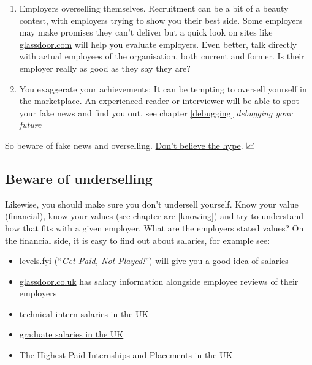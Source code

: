 \documentclass[
]{book}
\providecommand{\tightlist}{%
  \setlength{\itemsep}{0pt}\setlength{\parskip}{0pt}}
\begin{document}
\begin{enumerate}
\def\labelenumi{\arabic{enumi}.}
\tightlist
\item
  Employers overselling themselves. Recruitment can be a bit of a beauty contest, with employers trying to show you their best side. Some employers may make promises they can't deliver but a quick look on sites like \href{https://www.glassdoor.com}{glassdoor.com} will help you evaluate employers. Even better, talk directly with actual employees of the organisation, both current and former. Is their employer really as good as they say they are?
\item
  You exaggerate your achievements: It can be tempting to oversell yourself in the marketplace. An experienced reader or interviewer will be able to spot your fake news and find you out, see chapter \ref{debugging} \emph{debugging your future}
\end{enumerate}

So beware of fake news and overselling. \href{https://en.wikipedia.org/wiki/Don\%27t_Believe_the_Hype}{Don't believe the hype}. \citep{dontbelievethehype} 📈

\hypertarget{undersell}{%
\subsection{Beware of underselling}\label{undersell}}

Likewise, you should make sure you don't undersell yourself. Know your value (financial), know your values (see chapter are \ref{knowing}) and try to understand how that fits with a given employer. What are the employers stated values? On the financial side, it is easy to find out about salaries, for example see:

\begin{itemize}
\tightlist
\item
  \href{https://www.levels.fyi/}{levels.fyi} (``\emph{Get Paid, Not Played!}'') will give you a good idea of salaries
\item
  \href{https://www.glassdoor.co.uk/}{glassdoor.co.uk} has salary information alongside employee reviews of their employers
\item
  \href{https://github.com/IgWod/interns-salaries-uk-2018}{technical intern salaries in the UK} \citep{igwod}
\item
  \href{https://luminate.prospects.ac.uk/graduate-salaries-in-the-uk}{graduate salaries in the UK} \citep{michaelgrove}
\item
  \href{https://www.ratemyplacement.co.uk/blog/highest-paid-internships-placements-uk/}{The Highest Paid Internships and Placements in the UK} \citep{louiseintern}
\end{itemize}
\end{document}
